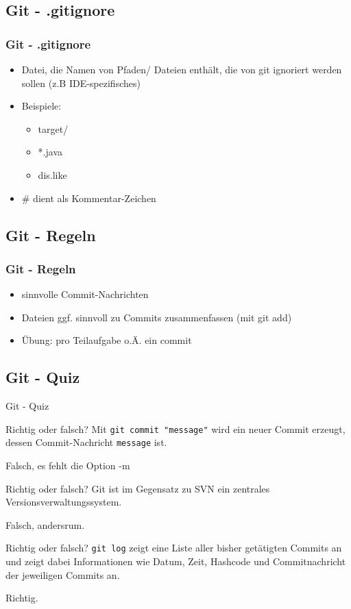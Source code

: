 \documentclass[18pt]{beamer}
\begin{document}
	\subsection{Git - .gitignore}
	\begin{frame}
		\frametitle{Git - .gitignore}
		\begin{itemize}
			\item Datei, die Namen von Pfaden/ Dateien enthält, die von git ignoriert werden sollen (z.B IDE-spezifisches)
			\item Beispiele: 
			\begin{itemize}
				\item target/
				\item *.java
				\item dis.like
			\end{itemize}
			\item \# dient als Kommentar-Zeichen
		\end{itemize}
	\end{frame}
	
	\subsection{Git - Regeln}
	\begin{frame}
		\frametitle{Git - Regeln }
		\begin{itemize}
			\item sinnvolle Commit-Nachrichten
			\item Dateien ggf. sinnvoll zu Commits zusammenfassen (mit git add)
			\item Übung: pro Teilaufgabe o.Ä. ein commit
		\end{itemize}
\end{frame}
	
	
	\subsection{Git - Quiz}
	\begin{frame}{Git - Quiz}
		\begin{block}{Richtig oder falsch?}
			Mit \texttt{git commit "message"} wird ein neuer Commit erzeugt, dessen Commit-Nachricht \texttt{message} ist.
		\end{block}
		\pause
		Falsch, es fehlt die Option -m
		\begin{block}{Richtig oder falsch?}
			Git ist im Gegensatz zu SVN ein zentrales Versionsverwaltungssystem.
		\end{block}
		\pause
		Falsch, andersrum.
		\begin{block}{Richtig oder falsch?}
			\texttt{git log} zeigt eine Liste aller bisher getätigten Commits an und zeigt dabei Informationen wie Datum, Zeit, Hashcode und Commitnachricht der jeweiligen Commits an.
		\end{block}
		\pause
		Richtig.
	\end{frame}
		
\end{document}

